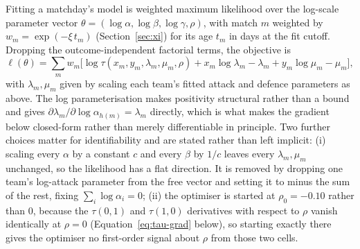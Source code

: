 \documentclass[11pt,a4paper]{article}
\begin{document}
Fitting a matchday's model is weighted maximum likelihood over the log-scale
parameter vector $\theta = (\log\alpha, \log\beta, \log\gamma, \rho)$, with
match $m$ weighted by $w_m = \exp(-\xi\,t_m)$
(Section~\ref{sec:xi}) for its age $t_m$ in days at the fit cutoff. Dropping
the outcome-independent factorial terms, the objective is
\begin{equation}
  \ell(\theta) = \sum_m w_m \Big[
    \log\tau(x_m,y_m,\lambda_m,\mu_m,\rho)
    + x_m\log\lambda_m - \lambda_m
    + y_m\log\mu_m - \mu_m
  \Big],
  \label{eq:loglik}
\end{equation}
with $\lambda_m, \mu_m$ given by scaling each team's fitted attack and defence
parameters as above. The log parameterisation makes positivity structural
rather than a bound and gives $\partial\lambda_m/\partial\log\alpha_{h(m)} =
\lambda_m$ directly, which is what makes the gradient below closed-form rather
than merely differentiable in principle. Two further choices matter for
identifiability and are stated rather than left implicit: (i) scaling every
$\alpha$ by a constant $c$ and every $\beta$ by $1/c$ leaves every
$\lambda_m,\mu_m$ unchanged, so the likelihood has a flat direction. It is
removed by dropping one team's log-attack parameter from the free vector and
setting it to minus the sum of the rest, fixing $\sum_i \log\alpha_i = 0$;
(ii) the optimiser is started at $\rho_0 = -0.10$ rather than $0$, because the
$\tau(0,1)$ and $\tau(1,0)$ derivatives with respect to $\rho$ vanish
identically at $\rho = 0$ (Equation~\eqref{eq:tau-grad} below), so starting
exactly there gives the optimiser no first-order signal about $\rho$ from
those two cells.
\end{document}
